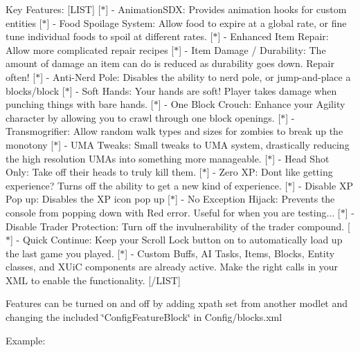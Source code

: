 Key Features\+: \mbox{[}L\+I\+ST\mbox{]} \mbox{[}$\ast$\mbox{]} -\/ Animation\+S\+DX\+: Provides animation hooks for custom entities \mbox{[}$\ast$\mbox{]} -\/ Food Spoilage System\+: Allow food to expire at a global rate, or fine tune individual foods to spoil at different rates. \mbox{[}$\ast$\mbox{]} -\/ Enhanced Item Repair\+: Allow more complicated repair recipes \mbox{[}$\ast$\mbox{]} -\/ Item Damage / Durability\+: The amount of damage an item can do is reduced as durability goes down. Repair often! \mbox{[}$\ast$\mbox{]} -\/ Anti-\/\+Nerd Pole\+: Disables the ability to nerd pole, or jump-\/and-\/place a blocks/block \mbox{[}$\ast$\mbox{]} -\/ Soft Hands\+: Your hands are soft! Player takes damage when punching things with bare hands. \mbox{[}$\ast$\mbox{]} -\/ One Block Crouch\+: Enhance your Agility character by allowing you to crawl through one block openings. \mbox{[}$\ast$\mbox{]} -\/ Transmogrifier\+: Allow random walk types and sizes for zombies to break up the monotony \mbox{[}$\ast$\mbox{]} -\/ U\+MA Tweaks\+: Small tweaks to U\+MA system, drastically reducing the high resolution U\+M\+As into something more manageable. \mbox{[}$\ast$\mbox{]} -\/ Head Shot Only\+: Take off their heads to truly kill them. \mbox{[}$\ast$\mbox{]} -\/ Zero XP\+: Don\textquotesingle{}t like getting experience? Turns off the ability to get a new kind of experience. \mbox{[}$\ast$\mbox{]} -\/ Disable XP Pop up\+: Disables the XP icon pop up \mbox{[}$\ast$\mbox{]} -\/ No Exception Hijack\+: Prevents the console from popping down with Red error. Useful for when you are testing... \mbox{[}$\ast$\mbox{]} -\/ Disable Trader Protection\+: Turn off the invulnerability of the trader compound. \mbox{[}$\ast$\mbox{]} -\/ Quick Continue\+: Keep your Scroll Lock button on to automatically load up the last game you played. \mbox{[}$\ast$\mbox{]} -\/ Custom Buffs, AI Tasks, Items, Blocks, Entity classes, and X\+UiC components are already active. Make the right calls in your X\+ML to enable the functionality. \mbox{[}/\+L\+I\+ST\mbox{]}

Features can be turned on and off by adding xpath set from another modlet and changing the included \char`\"{}\+Config\+Feature\+Block\char`\"{} in Config/blocks.\+xml

Example\+:

